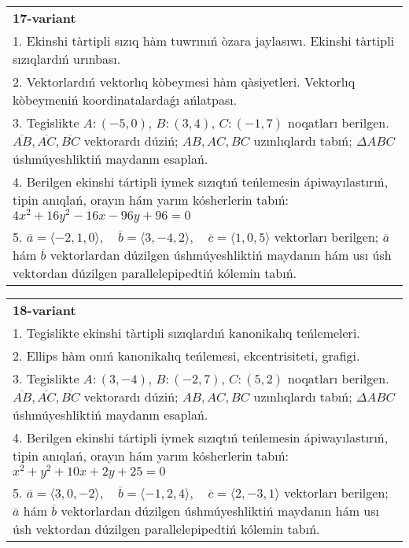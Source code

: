 \documentclass{article}
\begin{document}
\begin{tabular}{m{17cm}}
\textbf{17-variant}\\
1. Ekinshi tàrtipli sızıq hàm tuwrınıń òzara jaylasıwı. Ekinshi tàrtipli sızıqlardıń urınbası.\\

2. Vektorlardıń vektorlıq kòbeymesi hàm qàsiyetleri. Vektorlıq kòbeymeniń koordinatalardaǵı ańlatpası. \\

3. Tegislikte $A: (-5, 0)$, $B: (3, 4)$, $C: (-1, 7)$ noqatları berilgen. $\overline{AB}, \overline{AC}, \overline{BC}$ vektorardı dúziń; $AB, AC, BC$ uzınlıqlardı tabıń; $\Delta ABC$ úshmúyeshliktiń maydanın esaplań. \\

4. Berilgen ekinshi tártipli iymek sızıqtıń teńlemesin ápiwayılastırıń, tipin anıqlań, orayın hám yarım kósherlerin tabıń: $4x^2+16y^2-16x-96y+96=0$\\

5. \(\overline{a} = \langle -2, 1, 0 \rangle, \quad \overline{b} = \langle 3, -4, 2 \rangle, \quad \overline{c} = \langle 1, 0, 5 \rangle\) vektorları berilgen; \(\overline{a}\) hám \(\overline{b}\) vektorlardan dúzilgen úshmúyeshliktiń maydanın hám usı úsh vektordan dúzilgen parallelepipedtiń kólemin tabıń.
\end{tabular}
\vspace{1cm}


\begin{tabular}{m{17cm}}
\textbf{18-variant}\\
1. Tegislikte ekinshi tàrtipli sızıqlardıń kanonikalıq teńlemeleri.\\

2. Ellips hàm onıń kanonikalıq teńlemesi, ekcentrisiteti, grafigi.\\

3. Tegislikte $A: (3, -4)$, $B: (-2, 7)$, $C: (5, 2)$ noqatları berilgen. $\overline{AB}, \overline{AC}, \overline{BC}$ vektorardı dúziń; $AB, AC, BC$ uzınlıqlardı tabıń; $\Delta ABC$ úshmúyeshliktiń maydanın esaplań. \\

4. Berilgen ekinshi tártipli iymek sızıqtıń teńlemesin ápiwayılastırıń, tipin anıqlań, orayın hám yarım kósherlerin tabıń: $x^2+y^2+10x+2y+25=0$\\

5. \(\overline{a} = \langle 3, 0, -2 \rangle, \quad \overline{b} = \langle -1, 2, 4 \rangle, \quad \overline{c} = \langle 2, -3, 1 \rangle\) vektorları berilgen; \(\overline{a}\) hám \(\overline{b}\) vektorlardan dúzilgen úshmúyeshliktiń maydanın hám usı úsh vektordan dúzilgen parallelepipedtiń kólemin tabıń.
\end{tabular}
\vspace{1cm}
\end{document}
